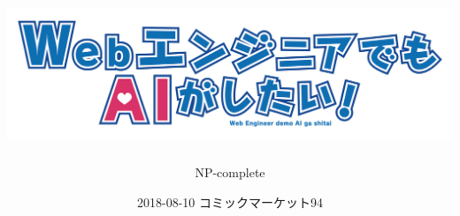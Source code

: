 \title{\includegraphics[width=\textwidth,height=\textheight,keepaspectratio]{./images/logo.png}}
\author{NP-complete}
\date{2018-08-10 コミックマーケット94}
\Huge
\maketitle
\normalsize
